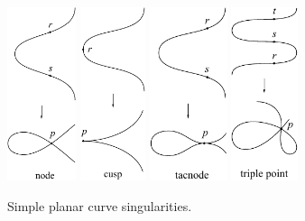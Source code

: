 \begin{figure}   %
\centerline{%
  \includegraphics[height=2in]{"main/Fig02-sing-node"}\hfil\quad
  \includegraphics[height=2in]{"main/Fig02-sing-cusp"}\hfil\quad
  \includegraphics[height=2in]{"main/Fig02-sing-tacnode"}\hfil\quad
  \includegraphics[height=2in]{"main/Fig02-sing-triple"}}
\caption{Simple planar curve singularities.
%
%
%
%
\label{simplesing}
}
\end{figure}


